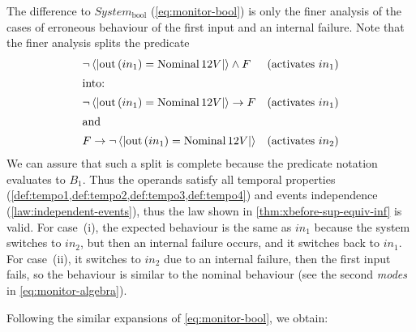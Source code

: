 \documentclass[12pt,openright,twoside,a4paper,oldfontcommands,english,brazil,final]{abntex2}
\theoremstyle{theo}
\def\xbeforeop{\ensuremath\rightarrow}
\newcommand{\xbefore}[2]{\ensuremath #1 \xbeforeop #2 }
\newcommand{\Nominal}[1]{\ensuremath\mathop{\mathrm{Nominal}} #1}
\newcommand{\predicate}[2]{\ensuremath\left\langle\left| \mathrm{out}\left(#1\right) = #2 \right|\right\rangle}
\begin{document}
\begin{sloppypar}
The difference to $System_{\mathrm{bool}}$ (\cref{eq:monitor-bool}) is only the finer analysis of the cases of erroneous behaviour of the first input and an internal failure.
Note that the finer analysis splits the predicate 
%
\begin{align*}
  & \lnot \predicate{in_1}{\Nominal{12V}} \land F & \text{(activates } in_1\text{)}\\
  \intertext{into:}
  & \xbefore{\lnot\predicate{in_1}{\Nominal{12V}}}{F} & \text{(activates } in_1\text{)}\\
  \intertext{and}
  & \xbefore{F}{\lnot\predicate{in_1}{\Nominal{12V}}} & \text{(activates } in_2\text{)}
\end{align*}
%
We can assure that such a split is complete because the predicate notation evaluates to $B_1$. 
Thus the operands satisfy all temporal properties (\cref{def:tempo1,def:tempo2,def:tempo3,def:tempo4}) and events independence (\cref{law:independent-events}), thus the law shown in \cref{thm:xbefore-sup-equiv-inf} is valid.
For case~(i), the expected behaviour is the same as $in_1$ because the system switches to $in_2$, but then an internal failure occurs, and it switches back to $in_1$.
For case~(ii), it switches to $in_2$ due to an internal failure, then the first input fails, so the behaviour is similar to the nominal behaviour (see the second \emph{modes} in \cref{eq:monitor-algebra}).
\end{sloppypar}
%
Following the similar expansions of \cref{eq:monitor-bool}, we obtain:
%
\end{document}
